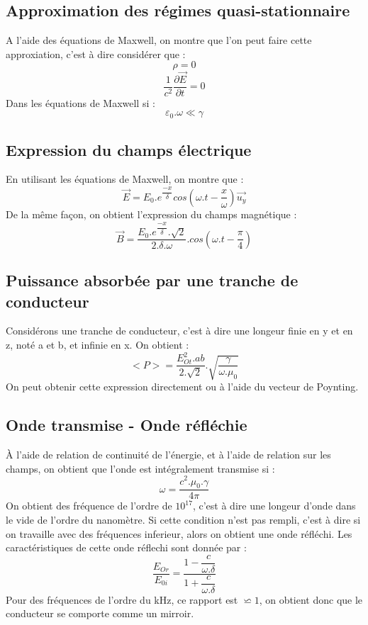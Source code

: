 \subsection{Approximation des régimes quasi-stationnaire}
A l'aide des équations de Maxwell, on montre que l'on peut faire cette approxiation, c'est à dire considérer que : 
$$\rho = 0$$
$$\dfrac{1}{c^2} \dfrac{\partial \overrightarrow{E}}{\partial t} = 0$$
Dans les équations de Maxwell si : 
$$\varepsilon_0.\omega \ll \gamma$$
\subsection{Expression du champs électrique}
En utilisant les équations de Maxwell, on montre que : 
$$\overrightarrow{E} = E_0.e^{\dfrac{-x}{\delta}}cos(\omega.t-\dfrac{x}{\omega})\overrightarrow{u_y}$$
De la même façon, on obtient l'expression du champs magnétique : 
$$\overrightarrow{B} = \dfrac{E_0.e^{\dfrac{-x}{\delta}}.\sqrt{2}}{2.\delta.\omega}.cos(\omega.t - \dfrac{\pi}{4})$$
\subsection{Puissance absorbée par une tranche de conducteur}
Considérons une tranche de conducteur, c'est à dire une longeur finie en y et en z, noté a et b, et infinie en x. On obtient : 
$$<P> = \dfrac{E_{Ot}^2.ab}{2.\sqrt{2}}.\sqrt{\dfrac{\gamma}{\omega.\mu_0}}$$
On peut obtenir cette expression directement ou à l'aide du vecteur de Poynting.
\subsection{Onde transmise - Onde réfléchie}
À l'aide de relation de continuité de l'énergie, et à l'aide de relation sur les champs, on obtient que l'onde est intégralement transmise si : 
$$\omega = \dfrac{c^2.\mu_0.\gamma}{4\pi}$$
On obtient des fréquence de l'ordre de $10^{17}$, c'est à dire une longeur d'onde dans le vide de l'ordre du nanomètre. Si cette condition n'est pas rempli, c'est à dire si on travaille avec des fréquences inferieur, alors on obtient une onde réfléchi. Les caractéristiques de cette onde réflechi sont donnée par :
$$\dfrac{E_{Or}}{E_{0i}} = \dfrac{1-\dfrac{c}{\omega.\delta}}{1 + \dfrac{c}{\omega.\delta}}$$
Pour des fréquences de l'ordre du kHz, ce rapport est $\backsimeq 1$, on obtient donc que le conducteur se comporte comme un mirroir.
